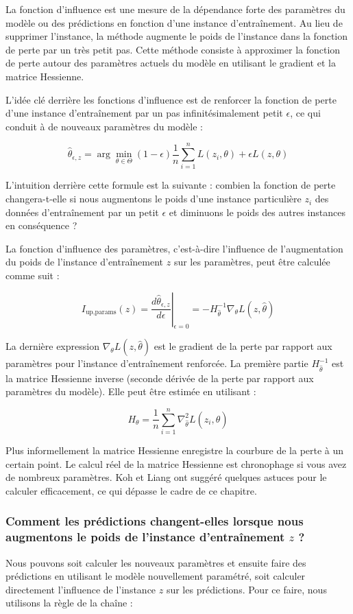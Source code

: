 La fonction d'influence est une mesure de la dépendance forte des paramètres du modèle ou des prédictions en fonction d'une instance d'entraînement. Au lieu de supprimer l'instance, la méthode augmente le poids de l'instance dans la fonction de perte par un très petit pas. Cette méthode consiste à approximer la fonction de perte autour des paramètres actuels du modèle en utilisant le gradient et la matrice Hessienne.

L'idée clé derrière les fonctions d'influence est de renforcer la fonction de perte d'une instance d'entraînement par un pas infinitésimalement petit \( \epsilon \), ce qui conduit à de nouveaux paramètres du modèle :

\[
\hat{\theta}_{\epsilon,z}=\arg\min_{\theta{}\in\Theta}(1-\epsilon)\frac{1}{n}\sum_{i=1}^n{}L(z_i,\theta)+\epsilon{}L(z,\theta)
\]

L'intuition derrière cette formule est la suivante : combien la fonction de perte changera-t-elle si nous augmentons le poids d'une instance particulière \( z_i \) des données d'entraînement par un petit \( \epsilon \) et diminuons le poids des autres instances en conséquence ?

La fonction d'influence des paramètres, c'est-à-dire l'influence de l'augmentation du poids de l'instance d'entraînement \( z \) sur les paramètres, peut être calculée comme suit :

\[
I_{\text{up,params}}(z)=\left.\frac{d{}\hat{\theta}_{\epsilon,z}}{d\epsilon}\right|_{\epsilon=0}=-H_{\hat{\theta}}^{-1}\nabla_{\theta}L(z,\hat{\theta})
\]

La dernière expression \( \nabla_{\theta}L(z,\hat{\theta}) \) est le gradient de la perte par rapport aux paramètres pour l'instance d'entraînement renforcée. La première partie \( H^{-1}_{\hat{\theta}} \) est la matrice Hessienne inverse (seconde dérivée de la perte par rapport aux paramètres du modèle). Elle peut être estimée en utilisant :

\[
H_{\theta}=\frac{1}{n}\sum_{i=1}^n\nabla^2_{\hat{\theta}}L(z_i,\hat{\theta})
\]

Plus informellement la matrice Hessienne enregistre la courbure de la perte à un certain point. Le calcul réel de la matrice Hessienne est chronophage si vous avez de nombreux paramètres. Koh et Liang ont suggéré quelques astuces pour le calculer efficacement, ce qui dépasse le cadre de ce chapitre.

\subsubsection{Comment les prédictions changent-elles lorsque nous augmentons le poids de l'instance d'entraînement \( z \) ?}
Nous pouvons soit calculer les nouveaux paramètres et ensuite faire des prédictions en utilisant le modèle nouvellement paramétré, soit calculer directement l'influence de l'instance $z$ sur les prédictions. Pour ce faire, nous utilisons la règle de la chaîne :

